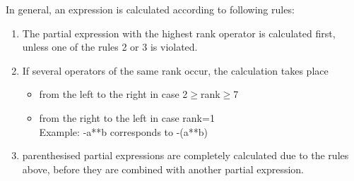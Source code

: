 In general, an expression is calculated according to following rules:
\begin{enumerate}
\item The partial expression with the highest rank operator is
calculated first, unless one of the rules 2 or 3 is violated.
\item If several operators of the same rank occur, the calculation takes
place
\begin{itemize}
\item from the left to the right in case 2$\ge$rank$\ge$7
\item from the right to the left in case rank=1\\
      Example: -a**b corresponds to -(a**b)
\end{itemize}
\item parenthesised partial expressions are completely calculated due to
the rules above, before they are combined with another partial
expression.
\end{enumerate}

